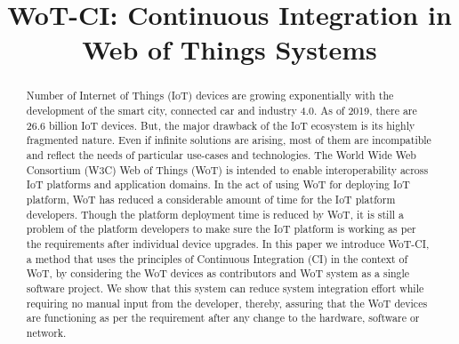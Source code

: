 \documentclass[conference]{IEEEtran}
\theoremstyle{definition}
\begin{document}
\title{WoT-CI: Continuous Integration in Web of Things Systems \\
}

\author{
  \and
  \and
}

\maketitle
 


\begin{abstract}

  Number of Internet of Things (IoT) devices are growing exponentially with the development of the smart city, connected car and industry 4.0.
  As of 2019, there are 26.6 billion IoT devices. 
  But, the major drawback of the IoT ecosystem is its highly fragmented nature. 
  Even if infinite solutions are arising, most of them are incompatible and reflect the needs of particular use-cases and technologies. 
  The World Wide Web Consortium (W3C) Web of Things (WoT) is intended to enable interoperability across IoT platforms and application domains. 
  In the act of using WoT for deploying IoT platform, WoT has reduced a considerable amount of time for the IoT platform developers. 
  Though the platform deployment time is reduced by WoT, it is still a problem of the platform developers to make sure the IoT platform is working as per the requirements after individual device upgrades.  
  In this paper we introduce WoT-CI, a method that uses the principles of Continuous Integration (CI) in the context of WoT, by considering the WoT devices as contributors and WoT system as a single software project. We show that this system can reduce system integration effort while requiring no manual input from the developer, thereby, assuring that the WoT devices are functioning as per the requirement after any change to the hardware, software or network.


\end{abstract}
\end{document}
